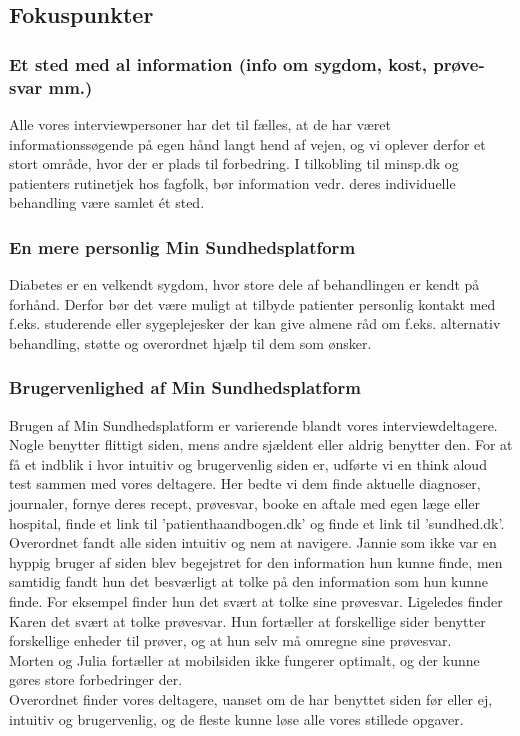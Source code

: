 \subsection{Fokuspunkter}
\subsubsection{Et sted med al information (info om sygdom, kost, prøve-svar mm.)}
Alle vores interviewpersoner har det til fælles, at de har været informationssøgende på egen hånd langt hend af vejen, og vi oplever derfor et stort område, hvor der er plads til forbedring. I tilkobling til minsp.dk og patienters rutinetjek hos fagfolk, bør information vedr. deres individuelle behandling være samlet ét sted.
\subsubsection{En mere personlig Min Sundhedsplatform}
Diabetes er en velkendt sygdom, hvor store dele af behandlingen er kendt på forhånd. Derfor bør det være muligt at tilbyde patienter personlig kontakt med f.eks. studerende eller sygeplejesker der kan give almene råd om f.eks. alternativ behandling, støtte og overordnet hjælp til dem som ønsker.
\subsubsection{Brugervenlighed af Min Sundhedsplatform}
Brugen af Min Sundhedsplatform er varierende blandt vores interviewdeltagere. Nogle benytter flittigt siden, mens andre sjældent eller aldrig benytter den. For at få et indblik i hvor intuitiv og brugervenlig siden er, udførte vi en think aloud test sammen med vores deltagere. Her bedte vi dem finde aktuelle diagnoser, journaler, fornye deres recept, prøvesvar, booke en aftale med egen læge eller hospital, finde et link til 'patienthaandbogen.dk' og finde et link til 'sundhed.dk'. Overordnet fandt alle siden intuitiv og nem at navigere. Jannie som ikke var en hyppig bruger af siden blev begejstret for den information hun kunne finde, men samtidig fandt hun det besværligt at tolke på den information som hun kunne finde. For eksempel finder hun det svært at tolke sine prøvesvar. Ligeledes finder Karen det svært at tolke prøvesvar. Hun fortæller at forskellige sider benytter forskellige enheder til prøver, og at hun selv må omregne sine prøvesvar.\\
Morten og Julia fortæller at mobilsiden ikke fungerer optimalt, og der kunne gøres store forbedringer der.\\
Overordnet finder vores deltagere, uanset om de har benyttet siden før eller ej, intuitiv og brugervenlig, og de fleste kunne løse alle vores stillede opgaver.
